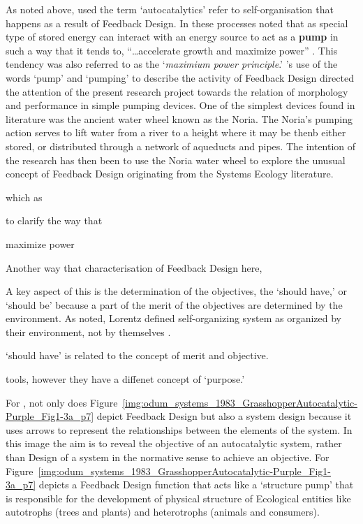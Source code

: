 \documentclass[a4paper,12pt]{article}
\begin{document}
As noted above, \citeauthor{odum_systems_1983} used the term `autocatalytics' refer to self-organisation that happens as a result of Feedback Design. In these processes \citeauthor{odum_systems_1983} noted that as special type of stored energy can interact with an energy source to act as a \textbf{pump} in such a way that it tends to, ``\dots accelerate growth and maximize power'' \citet[p.~141]{odum_systems_1983}. This tendency was also referred to as the `\textit{maximium power principle}.' \citeauthor{odum_systems_1983}'s use of the words `pump' and `pumping' to describe the activity of Feedback Design directed the attention of the present research project towards the relation of morphology and performance in simple pumping devices. One of the simplest devices found in literature was the ancient water wheel known as the Noria. The Noria's pumping action serves to lift water from a river to a height where it may be thenb  either stored, or distributed through a network of aqueducts and pipes. The intention of the research has then been to use the Noria water wheel to explore the unusual concept of Feedback Design originating from the Systems Ecology literature.




which as 




to clarify the way that 

maximize power



Another way that  characterisation of Feedback Design here,  


A key aspect of this is the determination of the objectives, the `should have,' or `should be' because a part of the merit of the objectives are determined by the environment. As \citeauthor{} noted, Lorentz defined self-organizing system as organized by their environment, not by themselves \citep[]{}. 


`should have' is related to the concept of merit and objective.

tools, however they have a diffenet concept of `purpose.'

For \citet[p.~7]{odum_systems_1983}, not only does Figure~\ref{img:odum_systems_1983_GrasshopperAutocatalytic-Purple_Fig1-3a_p7} depict 
Feedback Design but also a system design because it uses arrows to represent the relationships between the elements of the system. In this image the aim is to reveal the objective of an autocatalytic system, rather than Design of a system in the normative sense to achieve an objective. For \citet[p.~102]{odum_systems_1983}Figure~\ref{img:odum_systems_1983_GrasshopperAutocatalytic-Purple_Fig1-3a_p7} depicts a Feedback Design function that acts like a `structure pump' that is responsible for the development of physical structure of Ecological entities like autotrophs (trees and plants) and heterotrophs (animals and consumers). 
\end{document}
